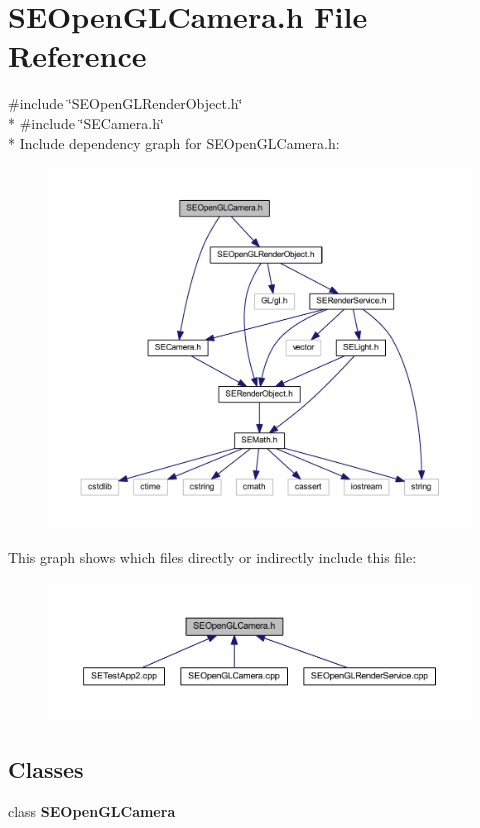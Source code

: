 \section{S\+E\+Open\+G\+L\+Camera.\+h File Reference}
\label{_s_e_open_g_l_camera_8h}
{\ttfamily \#include \char`\"{}S\+E\+Open\+G\+L\+Render\+Object.\+h\char`\"{}}\\*
{\ttfamily \#include \char`\"{}S\+E\+Camera.\+h\char`\"{}}\\*
Include dependency graph for S\+E\+Open\+G\+L\+Camera.\+h\+:
\nopagebreak
\begin{figure}[H]
\begin{center}
\leavevmode
\includegraphics[width=350pt]{_s_e_open_g_l_camera_8h__incl}
\end{center}
\end{figure}
This graph shows which files directly or indirectly include this file\+:
\nopagebreak
\begin{figure}[H]
\begin{center}
\leavevmode
\includegraphics[width=350pt]{_s_e_open_g_l_camera_8h__dep__incl}
\end{center}
\end{figure}
\subsection*{Classes}
\begin{DoxyCompactItemize}
\item 
class {\bf S\+E\+Open\+G\+L\+Camera}
\end{DoxyCompactItemize}
